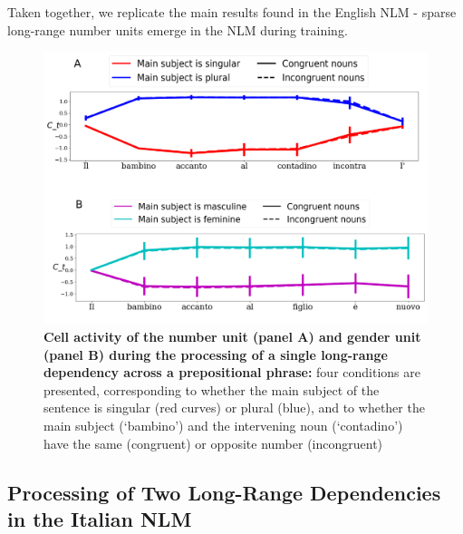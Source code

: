 \vspace{10pt}

Taken together, we replicate the main results found in the English NLM - sparse long-range number units emerge in the NLM during training. 

\begin{figure}
    \centering
    \includegraphics[width=\textwidth]{figures/model_activations_nounpp.png}
    \caption{\textbf{Cell activity of the number unit (panel A) and gender unit (panel B) during the processing of a single long-range dependency across a prepositional phrase:} four conditions are presented, corresponding to whether the main subject of the sentence is singular (red curves) or plural (blue), and to whether the main subject (`bambino') and the intervening noun (`contadino') have the same (congruent) or opposite number (incongruent)}
    \label{fig:nounpp}
\end{figure} 
\subsection{Processing of Two Long-Range Dependencies in the Italian NLM}

